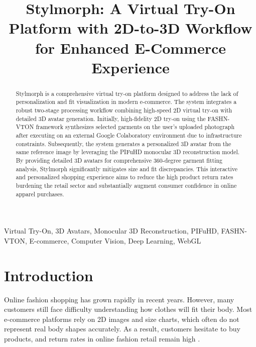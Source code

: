 \documentclass[conference]{IEEEtran}
\begin{document}
\title{Stylmorph: A Virtual Try-On Platform with 2D-to-3D Workflow for Enhanced E-Commerce Experience}

\author{
}

\maketitle

\begin{abstract}
Stylmorph is a comprehensive virtual try-on platform designed to address the lack of personalization and fit visualization in modern e-commerce. The system integrates a robust two-stage processing workflow combining high-speed 2D virtual try-on with detailed 3D avatar generation. Initially, high-fidelity 2D try-on using the FASHN-VTON framework synthesizes selected garments on the user's uploaded photograph after executing on an external Google Colaboratory environment due to infrastructure constraints. Subsequently, the system generates a personalized 3D avatar from the same reference image by leveraging the PIFuHD monocular 3D reconstruction model. By providing detailed 3D avatars for comprehensive 360-degree garment fitting analysis, Stylmorph significantly mitigates size and fit discrepancies. This interactive and personalized shopping experience aims to reduce the high product return rates burdening the retail sector and substantially augment consumer confidence in online apparel purchases.
\end{abstract}

\begin{IEEEkeywords}
Virtual Try-On, 3D Avatars, Monocular 3D Reconstruction, PIFuHD, FASHN-VTON, E-commerce, Computer Vision, Deep Learning, WebGL
\end{IEEEkeywords}

\section{Introduction}

Online fashion shopping has grown rapidly in recent years. However, many customers still face difficulty understanding how clothes will fit their body. Most e-commerce platforms rely on 2D images and size charts, which often do not represent real body shapes accurately. As a result, customers hesitate to buy products, and return rates in online fashion retail remain high \cite{b7}.
\end{document}
